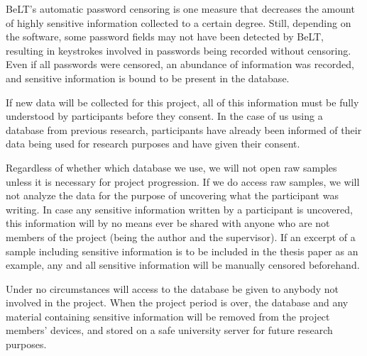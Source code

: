 \documentclass[informationsecurity]{gucmasterproject}
\begin{document}
BeLT's automatic password censoring is one measure that decreases the amount of highly sensitive information collected to a certain degree.
Still, depending on the software, some password fields may not have been detected by BeLT, resulting in keystrokes involved in passwords being recorded without censoring. 
Even if all passwords were censored, an abundance of information was recorded, and sensitive information is bound to be present in the database.

If new data will be collected for this project, all of this information must be fully understood by participants before they consent.
In the case of us using a database from previous research, participants have already been informed of their data being used for research purposes and have given their consent.

Regardless of whether which database we use, we will not open raw samples unless it is necessary for project progression.
If we do access raw samples, we will not analyze the data for the purpose of uncovering what the participant was writing.
In case any sensitive information written by a participant is uncovered, this information will by no means ever be shared with anyone who are not members of the project (being the author and the supervisor).
If an excerpt of a sample including sensitive information is to be included in the thesis paper as an example, any and all sensitive information will be manually censored beforehand.

Under no circumstances will access to the database be given to anybody not involved in the project.
When the project period is over, the database and any material containing sensitive information will be removed from the project members' devices, and stored on a safe university server for future research purposes.


%
\end{document}
